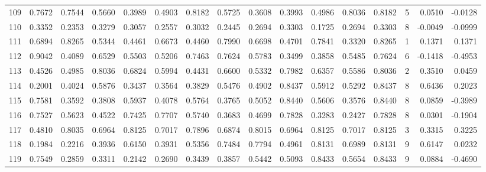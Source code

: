 \begin{tabular}{lrrrrrrrrrrrrrrr}
109 &      0.7672 &  0.7544 &  0.5660 &  0.3989 &  0.4903 &  0.8182 &  0.5725 &  0.3608 &  0.3993 &  0.4986 &   0.8036 &     0.8182 &      5 &                    0.0510 &                    -0.0128 \\
110 &      0.3352 &  0.2353 &  0.3279 &  0.3057 &  0.2557 &  0.3032 &  0.2445 &  0.2694 &  0.3303 &  0.1725 &   0.2694 &     0.3303 &      8 &                   -0.0049 &                    -0.0999 \\
111 &      0.6894 &  0.8265 &  0.5344 &  0.4461 &  0.6673 &  0.4460 &  0.7990 &  0.6698 &  0.4701 &  0.7841 &   0.3320 &     0.8265 &      1 &                    0.1371 &                     0.1371 \\
112 &      0.9042 &  0.4089 &  0.6529 &  0.5503 &  0.5206 &  0.7463 &  0.7624 &  0.5783 &  0.3499 &  0.3858 &   0.5485 &     0.7624 &      6 &                   -0.1418 &                    -0.4953 \\
113 &      0.4526 &  0.4985 &  0.8036 &  0.6824 &  0.5994 &  0.4431 &  0.6600 &  0.5332 &  0.7982 &  0.6357 &   0.5586 &     0.8036 &      2 &                    0.3510 &                     0.0459 \\
114 &      0.2001 &  0.4024 &  0.5876 &  0.3437 &  0.3564 &  0.3829 &  0.5476 &  0.4902 &  0.8437 &  0.5912 &   0.5292 &     0.8437 &      8 &                    0.6436 &                     0.2023 \\
115 &      0.7581 &  0.3592 &  0.3808 &  0.5937 &  0.4078 &  0.5764 &  0.3765 &  0.5052 &  0.8440 &  0.5606 &   0.3576 &     0.8440 &      8 &                    0.0859 &                    -0.3989 \\
116 &      0.7527 &  0.5623 &  0.4522 &  0.7425 &  0.7707 &  0.5740 &  0.3683 &  0.4699 &  0.7828 &  0.3283 &   0.2427 &     0.7828 &      8 &                    0.0301 &                    -0.1904 \\
117 &      0.4810 &  0.8035 &  0.6964 &  0.8125 &  0.7017 &  0.7896 &  0.6874 &  0.8015 &  0.6964 &  0.8125 &   0.7017 &     0.8125 &      3 &                    0.3315 &                     0.3225 \\
118 &      0.1984 &  0.2216 &  0.3936 &  0.6150 &  0.3931 &  0.5356 &  0.7484 &  0.7794 &  0.4961 &  0.8131 &   0.6989 &     0.8131 &      9 &                    0.6147 &                     0.0232 \\
119 &      0.7549 &  0.2859 &  0.3311 &  0.2142 &  0.2690 &  0.3439 &  0.3857 &  0.5442 &  0.5093 &  0.8433 &   0.5654 &     0.8433 &      9 &                    0.0884 &                    -0.4690 \\

\end{tabular}
